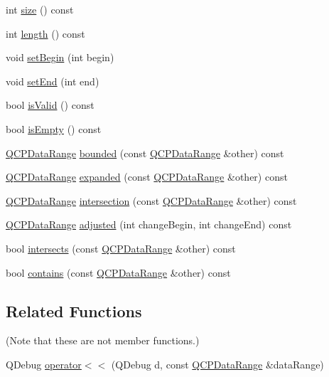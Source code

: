 \begin{DoxyCompactItemize}
\item 
int \hyperlink{classQCPDataRange_aec29c6f4234c01ed7a56c3bb0e75f340}{size} () const 
\item 
int \hyperlink{classQCPDataRange_a4e65d1bf09fce82dbc67a7b71b2cf088}{length} () const 
\item 
void \hyperlink{classQCPDataRange_a54ff59048e01e46ac4aefafc844626c6}{set\+Begin} (int begin)
\item 
void \hyperlink{classQCPDataRange_a277f1a9eafe70b9184d9c00b641ae5de}{set\+End} (int end)
\item 
bool \hyperlink{classQCPDataRange_a063eeb2c81e86900d974936cbb83f508}{is\+Valid} () const 
\item 
bool \hyperlink{classQCPDataRange_a2ab2e0710dbd4493133ab582ef7e5fc3}{is\+Empty} () const 
\item 
\hyperlink{classQCPDataRange}{Q\+C\+P\+Data\+Range} \hyperlink{classQCPDataRange_a4de1bec5a6e1145bd332d93ac2cc8327}{bounded} (const \hyperlink{classQCPDataRange}{Q\+C\+P\+Data\+Range} \&other) const 
\item 
\hyperlink{classQCPDataRange}{Q\+C\+P\+Data\+Range} \hyperlink{classQCPDataRange_a92eb8e85db62f0f833486fa4521fb586}{expanded} (const \hyperlink{classQCPDataRange}{Q\+C\+P\+Data\+Range} \&other) const 
\item 
\hyperlink{classQCPDataRange}{Q\+C\+P\+Data\+Range} \hyperlink{classQCPDataRange_a2c56cbc35c3beaed34fca1839d570520}{intersection} (const \hyperlink{classQCPDataRange}{Q\+C\+P\+Data\+Range} \&other) const 
\item 
\hyperlink{classQCPDataRange}{Q\+C\+P\+Data\+Range} \hyperlink{classQCPDataRange_a7a7a144cd3df55a6e011b9a84f0f8b69}{adjusted} (int change\+Begin, int change\+End) const 
\item 
bool \hyperlink{classQCPDataRange_afda3603f6ca7cb5c518cdaeea45af267}{intersects} (const \hyperlink{classQCPDataRange}{Q\+C\+P\+Data\+Range} \&other) const 
\item 
bool \hyperlink{classQCPDataRange_a691620b718e4bcefb77bcdde88bd1b34}{contains} (const \hyperlink{classQCPDataRange}{Q\+C\+P\+Data\+Range} \&other) const 
\end{DoxyCompactItemize}
\subsection*{Related Functions}
(Note that these are not member functions.) \begin{DoxyCompactItemize}
\item 
Q\+Debug \hyperlink{classQCPDataRange_a486dd7af8a090ed069672e3510e6a082}{operator$<$$<$} (Q\+Debug d, const \hyperlink{classQCPDataRange}{Q\+C\+P\+Data\+Range} \&data\+Range)
\end{DoxyCompactItemize}


